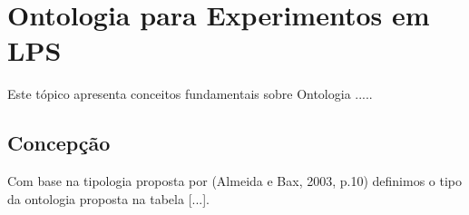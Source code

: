 \chapter{Ontologia para Experimentos em LPS}
\label{sec:ontologia}

Este tópico apresenta conceitos fundamentais sobre Ontologia .....

\section{Concepção}
\label{sec:concepcao}

Com base na tipologia proposta por (Almeida e Bax, 2003, p.10) definimos o tipo da ontologia proposta na tabela [...].
